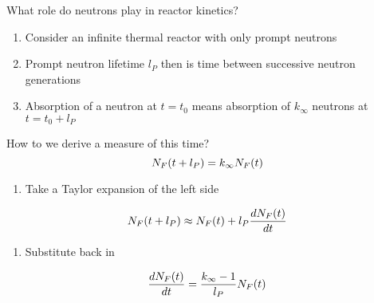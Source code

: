 \documentclass[aspectratio=1610,pdftex,dvipsnames,compress,xcolor={dvipsnames}]{beamer}
\begin{document}
\begin{frame}{What role do neutrons play in reactor kinetics?}
    \begin{enumerate}[series=outerlist,topsep=0pt,itemsep=21pt,leftmargin=*,label=(\arabic*)]
        \item[]Consider an infinite thermal reactor with only prompt neutrons
        \item[]Prompt neutron lifetime $l_P$ then is time between successive neutron generations
        \item[]Absorption of a neutron at $t=t_0$ means absorption of $k_\infty$ neutrons at $t=t_0+l_P$
    \end{enumerate}
\end{frame}


\begin{frame}{How to we derive a measure of this time?}
    \begin{equation}
        \LARGE
        N_F(t + l_P) = k_\infty N_F(t)
    \end{equation}

    \vspace*{\fill}

    \begin{enumerate}[series=outerlist,topsep=0pt,itemsep=21pt,leftmargin=*,label=(\arabic*)]
        \item[]Take a Taylor expansion of the left side
    \end{enumerate}

    \vspace*{\fill}

    \begin{equation}
        \LARGE
        N_F(t + l_P) \approx N_F(t) + l_P\frac{dN_F(t)}{dt}
    \end{equation}

    \vspace*{\fill}

    \begin{enumerate}[series=outerlist,topsep=0pt,itemsep=21pt,leftmargin=*,label=(\arabic*)]
        \item[]Substitute back in
    \end{enumerate}

    \vspace*{\fill}

    \begin{equation}
        \LARGE
        \frac{dN_F(t)}{dt} = \frac{k_\infty - 1}{l_P}N_F(t)
    \end{equation}
\end{frame}
\end{document}
